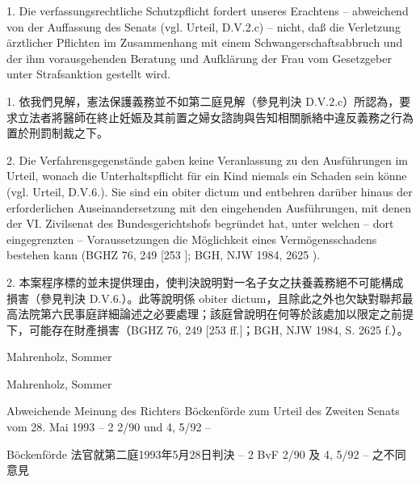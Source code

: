 \documentclass[12pt]{article}
\begin{document}
\begin{sourcepara}[title={原文SondervotumMS.312}]
1. Die verfassungsrechtliche Schutzpflicht fordert unseres Erachtens -- abweichend von der Auffassung des Senats (vgl. Urteil, D.V.2.c) -- nicht, daß die Verletzung ärztlicher Pflichten im Zusammenhang mit einem Schwangerschaftsabbruch und der ihm vorausgehenden Beratung und Aufklärung der Frau vom Gesetzgeber unter Strafsanktion gestellt wird.
\end{sourcepara}
\begin{transpara}
1. 依我們見解，憲法保護義務並不如第二庭見解（參見判決 D.V.2.c）所認為，要求立法者將醫師在終止妊娠及其前置之婦女諮詢與告知相關脈絡中違反義務之行為置於刑罰制裁之下。
\end{transpara}

\begin{sourcepara}[title={原文SondervotumMS.313}]
2. Die Verfahrensgegenstände gaben keine Veranlassung zu den Ausführungen im Urteil, wonach die Unterhaltspflicht für ein Kind niemals ein Schaden sein könne (vgl. Urteil, D.V.6.). Sie sind ein obiter dictum und entbehren darüber hinaus der erforderlichen Auseinandersetzung mit den eingehenden Ausführungen, mit denen der VI. Zivilsenat des Bundesgerichtshofs begründet hat, unter welchen -- dort eingegrenzten -- Voraussetzungen die Möglichkeit eines Vermögensschadens bestehen kann (BGHZ 76, 249 [253 \abbrFF{}]; BGH, NJW 1984, \abbrS{} 2625 \abbrF{}).
\end{sourcepara}
\begin{transpara}
2. 本案程序標的並未提供理由，使判決說明對一名子女之扶養義務絕不可能構成損害（參見判決 D.V.6.）。此等說明係 obiter dictum，且除此之外也欠缺對聯邦最高法院第六民事庭詳細論述之必要處理；該庭曾說明在何等於該處加以限定之前提下，可能存在財產損害（BGHZ 76, 249 [253 ff.]；BGH, NJW 1984, S. 2625 f.）。
\end{transpara}

\begin{sourcepara}[title={原文SondervotumMS.314}]
Mahrenholz, Sommer
\end{sourcepara}
\begin{transpara}
Mahrenholz, Sommer
\end{transpara}


\begin{sourcepara}[title={原文SondervotumB.315}]
Abweichende Meinung des Richters Böckenförde zum Urteil des Zweiten Senats vom 28. Mai 1993 -- 2 \abbrBvF{} 2/90 und 4, 5/92 --
\end{sourcepara}
\begin{transpara}
Böckenförde 法官就第二庭1993年5月28日判決 -- 2 BvF 2/90 及 4, 5/92 -- 之不同意見
\end{transpara}
\end{document}
